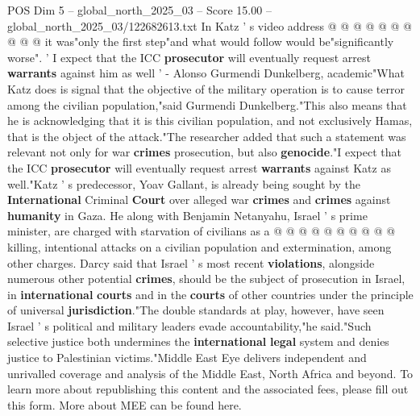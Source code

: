 \begin{textsample}{POS Dim 5 – global\_north\_2025\_03 – Score 15.00 – global\_north\_2025\_03/122682613.txt}
In Katz ' s video address @ @ @ @ @ @ @ @ @ @ it was"only the first step"and what would follow would be"significantly worse". ' I expect that the ICC \textbf{prosecutor} will eventually request arrest \textbf{warrants} against him as well ' - Alonso Gurmendi Dunkelberg, academic"What Katz does is signal that the objective of the military operation is to cause terror among the civilian population,"said Gurmendi Dunkelberg."This also means that he is acknowledging that it is this civilian population, and not exclusively Hamas, that is the object of the attack."The researcher added that such a statement was relevant not only for war \textbf{crimes} prosecution, but also \textbf{genocide}."I expect that the ICC \textbf{prosecutor} will eventually request arrest \textbf{warrants} against Katz as well."Katz ' s predecessor, Yoav Gallant, is already being sought by the \textbf{International} Criminal \textbf{Court} over alleged war \textbf{crimes} and \textbf{crimes} against \textbf{humanity} in Gaza.
He along with Benjamin Netanyahu, Israel ' s prime minister, are charged with starvation of civilians as a @ @ @ @ @ @ @ @ @ @ killing, intentional attacks on a civilian population and extermination, among other charges.
Darcy said that Israel ' s most recent \textbf{violations}, alongside numerous other potential \textbf{crimes}, should be the subject of prosecution in Israel, in \textbf{international} \textbf{courts} and in the \textbf{courts} of other countries under the principle of universal \textbf{jurisdiction}."The double standards at play, however, have seen Israel ' s political and military leaders evade accountability,"he said."Such selective justice both undermines the \textbf{international} \textbf{legal} system and denies justice to Palestinian victims."Middle East Eye delivers independent and unrivalled coverage and analysis of the Middle East, North Africa and beyond.
To learn more about republishing this content and the associated fees, please fill out this form.
More about MEE can be found here.

\end{textsample}
